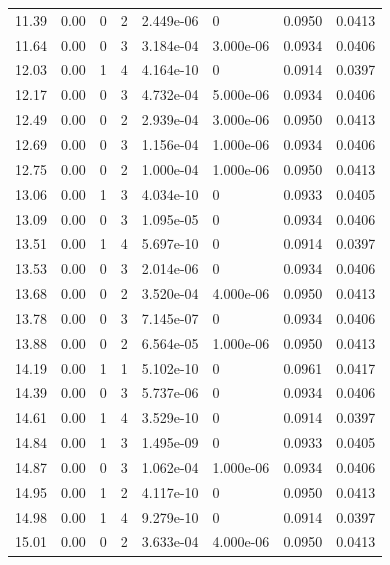 \documentclass[preview]{standalone}
\begin{document}
{{{\begin{tabular}{L{1.2cm}C{1.2cm} C{0.3cm}C{0.5cm} C{1.4cm}C{1.4cm} C{1.4cm}C{1.4cm}}
  11.39  &  0.00  & 0     &  2 &  2.449e-06  & 0  & 0.0950 &  0.0413   \\ 
  11.64  &  0.00  & 0     &  3 &  3.184e-04  & 3.000e-06  & 0.0934 &  0.0406   \\ 
  12.03  &  0.00  & 1     &  4 &  4.164e-10  & 0  & 0.0914 &  0.0397   \\ 
  12.17  &  0.00  & 0     &  3 &  4.732e-04  & 5.000e-06  & 0.0934 &  0.0406   \\ 
  12.49  &  0.00  & 0     &  2 &  2.939e-04  & 3.000e-06  & 0.0950 &  0.0413   \\ 
  12.69  &  0.00  & 0     &  3 &  1.156e-04  & 1.000e-06  & 0.0934 &  0.0406   \\ 
  12.75  &  0.00  & 0     &  2 &  1.000e-04  & 1.000e-06  & 0.0950 &  0.0413   \\ 
  13.06  &  0.00  & 1     &  3 &  4.034e-10  & 0  & 0.0933 &  0.0405   \\ 
  13.09  &  0.00  & 0     &  3 &  1.095e-05  & 0  & 0.0934 &  0.0406   \\ 
  13.51  &  0.00  & 1     &  4 &  5.697e-10  & 0  & 0.0914 &  0.0397   \\ 
  13.53  &  0.00  & 0     &  3 &  2.014e-06  & 0  & 0.0934 &  0.0406   \\ 
  13.68  &  0.00  & 0     &  2 &  3.520e-04  & 4.000e-06  & 0.0950 &  0.0413   \\ 
  13.78  &  0.00  & 0     &  3 &  7.145e-07  & 0  & 0.0934 &  0.0406   \\ 
  13.88  &  0.00  & 0     &  2 &  6.564e-05  & 1.000e-06  & 0.0950 &  0.0413   \\ 
  14.19  &  0.00  & 1     &  1 &  5.102e-10  & 0  & 0.0961 &  0.0417   \\ 
  14.39  &  0.00  & 0     &  3 &  5.737e-06  & 0  & 0.0934 &  0.0406   \\ 
  14.61  &  0.00  & 1     &  4 &  3.529e-10  & 0  & 0.0914 &  0.0397   \\ 
  14.84  &  0.00  & 1     &  3 &  1.495e-09  & 0  & 0.0933 &  0.0405   \\ 
  14.87  &  0.00  & 0     &  3 &  1.062e-04  & 1.000e-06  & 0.0934 &  0.0406   \\ 
  14.95  &  0.00  & 1     &  2 &  4.117e-10  & 0  & 0.0950 &  0.0413   \\ 
  14.98  &  0.00  & 1     &  4 &  9.279e-10  & 0  & 0.0914 &  0.0397   \\ 
  15.01  &  0.00  & 0     &  2 &  3.633e-04  & 4.000e-06  & 0.0950 &  0.0413   \\ 

\end{tabular}}}}
\end{document}
